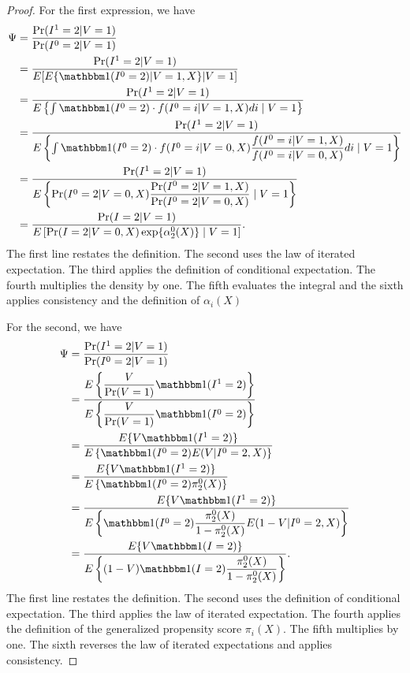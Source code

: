 \begin{appendix}
    \begin{proof}
    For the first expression, we have 
    \begin{align*}
        \Psi &= \dfrac{\Pr(I^1=2|V=1)}{\Pr(I^0=2|V=1)} \\
        &= \dfrac{\Pr(I^1=2|V=1)}{E[E\{\mathbbm 1 (I^0 = 2) | V = 1, X\} | V = 1]} \\
        &= \dfrac{\Pr(I^1=2|V=1)}{E\left\{\int \mathbbm 1 (I^0 = 2) \cdot f(I^0 = i | V = 1, X) di \mid  V = 1\right\}} \\
        &= \dfrac{\Pr(I^1=2|V=1)}{E\left\{\int \mathbbm 1 (I^0 = 2) \cdot f(I^0 = i | V = 0, X) \dfrac{f(I^0 = i | V = 1, X)}{f(I^0 = i | V = 0, X)}di \mid  V = 1\right\}} \\
        &= \dfrac{\Pr(I^1=2|V=1)}{E\left\{ \Pr(I^0 = 2 | V = 0, X) \dfrac{\Pr(I^0 = 2 | V = 1, X)}{\Pr(I^0 = 2 | V = 0, X)} \mid  V = 1\right\}} \\
        &= \dfrac{\Pr(I=2|V=1)}{E\left[ \Pr(I = 2 | V = 0, X) \exp\{\alpha^0_2(X)\} \mid  V = 1\right]}.
    \end{align*}
    The first line restates the definition. The second uses the law of iterated expectation. The third applies the definition of conditional expectation. The fourth multiplies the density by one. The fifth evaluates the integral and the sixth applies consistency and the definition of $\alpha_i(X)$
    
    For the second, we have 
    \begin{align*}
        \Psi &= \dfrac{\Pr(I^1=2|V=1)}{\Pr(I^0=2|V=1)} \\
        &= \dfrac{E\left\{\dfrac{V}{\Pr(V = 1)} \mathbbm 1 (I^1 = 2)\right\}}{E\left\{\dfrac{V}{\Pr(V=1)}\mathbbm 1 (I^0 = 2)\right\}} \\
        &= \dfrac{E\{V \mathbbm 1 (I^1 = 2)\}}{E\left\{\mathbbm 1 (I^0 = 2) E(V | I^0 = 2, X)\right\}} \\
        &= \dfrac{E\{V \mathbbm 1 (I^1 = 2)\}}{E\left\{\mathbbm 1 (I^0 = 2) \pi^0_2(X)\right\}} \\
        &= \dfrac{E\{V \mathbbm 1 (I^1 = 2)\}}{E\left\{\mathbbm 1 (I^0 = 2) \dfrac{\pi^0_2(X)}{1-\pi^0_2(X)}E(1-V|I^0 = 2, X)\right\}} \\
        &= \dfrac{E\{V \mathbbm 1 (I = 2)\}}{E\left\{(1 - V)\mathbbm 1 (I = 2) \dfrac{\pi^0_2(X)}{1-\pi^0_2(X)}\right\}}.
    \end{align*}
    The first line restates the definition. The second uses the definition of conditional expectation. The third applies the law of iterated expectation. The fourth applies the definition of the generalized propensity score $\pi_i(X)$. The fifth multiplies by one. The sixth reverses the law of iterated expectations and applies consistency. 
    \end{proof}
    \newpage
    

\end{appendix}
